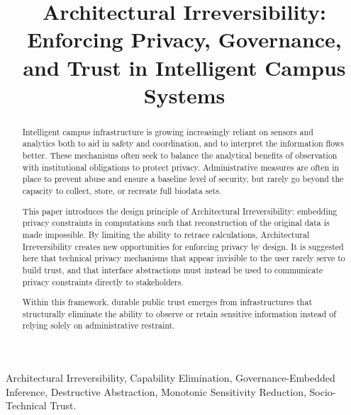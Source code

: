 \documentclass[conference]{IEEEtran}
\begin{document}
\title{Architectural Irreversibility: Enforcing Privacy, Governance, and Trust in Intelligent Campus Systems}

\author{
}

\maketitle

\begin{abstract}
Intelligent campus infrastructure is growing increasingly reliant on sensors and analytics both to aid in safety and coordination, and to interpret the information flows better. These mechanisms often seek to balance the analytical benefits of observation with institutional obligations to protect privacy. Administrative measures are often in place to prevent abuse and ensure a baseline level of security, but rarely go beyond the capacity to collect, store, or recreate full biodata sets.

This paper introduces the design principle of Architectural Irreversibility: embedding privacy constraints in computations such that reconstruction of the original data is made impossible. By limiting the ability to retrace calculations, Architectural Irreversibility creates new opportunities for enforcing privacy by design. It is suggested here that technical privacy mechanisms that appear invisible to the user rarely serve to build trust, and that interface abstractions must instead be used to communicate privacy constraints directly to stakeholders.

Within this framework, durable public trust emerges from infrastructures that structurally eliminate the ability to observe or retain sensitive information instead of relying solely on administrative restraint.
\end{abstract}

\begin{IEEEkeywords}
Architectural Irreversibility, Capability Elimination, Governance-Embedded Inference, Destructive Abstraction, Monotonic Sensitivity Reduction, Socio-Technical Trust.
\end{IEEEkeywords}
\end{document}
